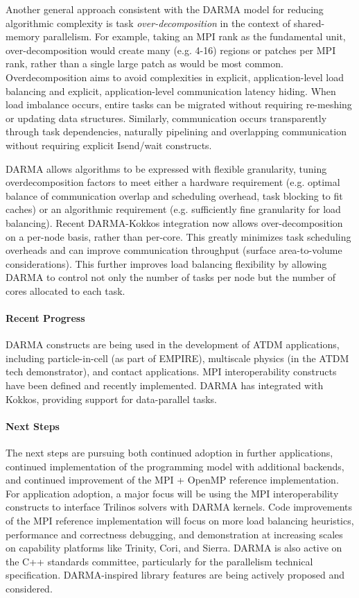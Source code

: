 Another general approach consistent with the DARMA model for reducing algorithmic complexity is task \emph{over-decomposition} in the context of shared-memory parallelism.
For example, taking an MPI rank as the fundamental unit, over-decomposition would create many (e.g. 4-16) regions or patches per MPI rank,
rather than a single large patch as would be most common.
Overdecomposition aims to avoid complexities in explicit, application-level load balancing and explicit, application-level communication latency hiding.
When load imbalance occurs, entire tasks can be migrated without requiring re-meshing or updating data structures.
Similarly, communication occurs transparently through task dependencies, naturally pipelining and overlapping communication without requiring explicit Isend/wait constructs.

DARMA allows algorithms to be expressed with flexible granularity, tuning overdecomposition factors to meet either a hardware requirement (e.g. optimal balance of communication overlap and scheduling overhead, task blocking to fit caches) or an algorithmic requirement (e.g. sufficiently fine granularity for load balancing).
Recent DARMA-Kokkos integration now allows over-decomposition on a per-node basis, rather than per-core.
This greatly minimizes task scheduling overheads and can improve communication throughput (surface area-to-volume considerations).
This further improves load balancing flexibility by allowing DARMA to control not only the number of tasks per node but the number of cores allocated to each task.

\paragraph{Recent Progress}
DARMA constructs are being used in the development of ATDM applications, including particle-in-cell (as part of EMPIRE), multiscale physics (in the ATDM tech demonstrator), and contact applications.  MPI interoperability constructs have been defined and recently implemented. DARMA has integrated with Kokkos, providing support for data-parallel tasks.

\paragraph{Next Steps}
The next steps are pursuing both continued adoption in further applications, continued implementation of the programming model with additional backends, and continued improvement of the MPI + OpenMP reference implementation.
For application adoption, a major focus will be using the MPI interoperability constructs to interface Trilinos solvers with DARMA kernels.
Code improvements of the MPI reference implementation will focus on more load balancing heuristics, performance and correctness debugging, and demonstration at increasing scales on capability platforms like Trinity, Cori, and Sierra.
DARMA is also active on the C++ standards committee, particularly for the parallelism technical specification. DARMA-inspired library features are being actively proposed and considered.
